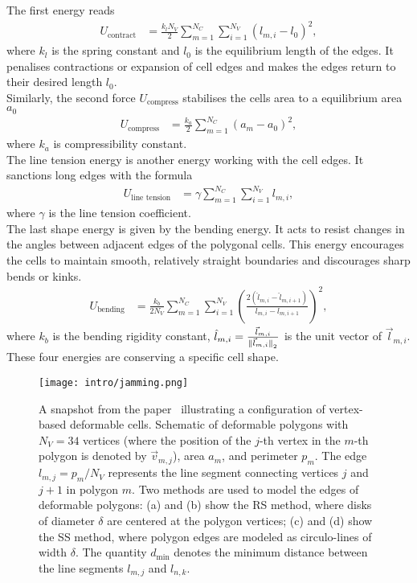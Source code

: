 The first energy reads
\begin{align*}
	U_{\text{contract}} &= \frac{k_l N_V}{2} \sum\limits_{m=1}^{N_C} \sum\limits_{i=1}^{N_V} (l_{m,i}-l_0)^2,
\end{align*}
where $k_l$ is the spring constant and $l_0$ is the equilibrium length of the edges. 
It penalises contractions or expansion of cell edges and makes the edges return to their desired length $l_0$. \\ 
Similarly, the second force $U_{\text{compress}}$ stabilises the cells area to a equilibrium area $a_0$ 
\begin{align*}
	U_{\text{compress}} &= \frac{k_a}{2} \sum\limits_{m=1}^{N_C} (a_m - a_0)^2, 
\end{align*}
where $k_a$ is compressibility constant. \\ 
The line tension energy is another energy working with the cell edges.
It sanctions long edges with the formula 
\begin{align*}
	U_{\text{line tension}} &= \gamma \sum\limits_{m=1}^{N_C} \sum\limits_{i=1}^{N_V} l_{m,i} ,
\end{align*}
where $\gamma$ is the line tension coefficient. \\
The last shape energy is given by the bending energy. 
It acts to resist changes in the angles between adjacent edges of the polygonal cells.
This energy encourages the cells to maintain smooth, relatively straight boundaries and discourages sharp bends or kinks.
\begin{align*}
	U_{\text{bending}} &= \frac{k_b}{2 N_V} \sum\limits_{m=1}^{N_C} \sum\limits_{i=1}^{N_V} \left( \frac{2( \hat{l}_{m,i} - \hat{l}_{m,i+1})}{l_{m,i} - l_{m,i+1}}  \right)^2 ,
\end{align*}
where $k_b$ is the bending rigidity constant, $\hat{l}_{m,i} = \frac{\vec{l}_{m,i}}{\norm[\vec{l}_{m,i}]} $ is the unit vector of $\vec{l}_{m,i}$.
These four energies are conserving a specific cell shape. \\
\begin{figure}[h!]
	\centering
	\texttt{[image: intro/jamming.png]}
	\caption{A snapshot from the paper~\cite{Boromand2018} illustrating a configuration of vertex-based deformable cells. 
	Schematic of deformable polygons with $N_V = 34$ vertices (where the position of the $j$-th vertex in the $m$-th polygon is denoted by $\vec{v}_{m,j}$), area $a_m$, and perimeter $p_m$. 
	The edge $l_{m,j} = p_m / N_V$ represents the line segment connecting vertices $j$ and $j+1$ in polygon $m$. 
	Two methods are used to model the edges of deformable polygons: (a) and (b) show the RS method, where disks of diameter $\delta$ are centered at the polygon vertices; (c) and (d) show the SS method, where polygon edges are modeled as circulo-lines of width $\delta$. 
	The quantity $d_{\text{min}}$ denotes the minimum distance between the line segments $l_{m,j}$ and $l_{n,k}$.
	}
	\label{fig:vertex}
\end{figure}
